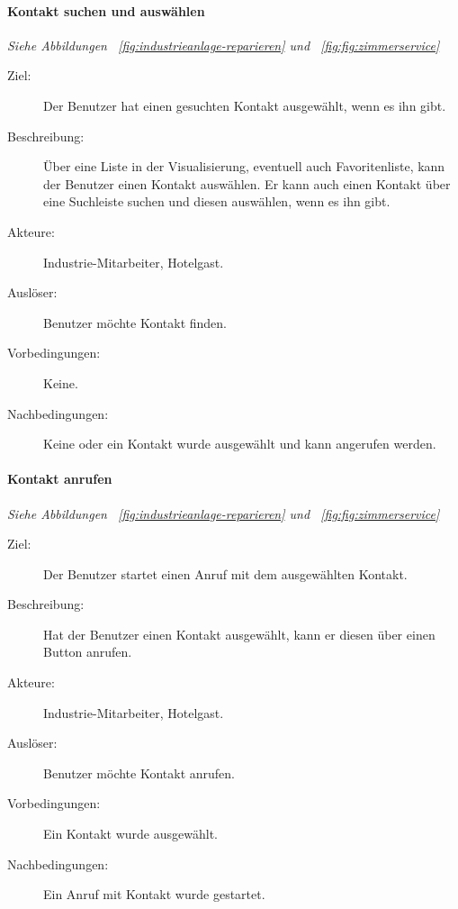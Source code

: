\paragraph{\large{Kontakt suchen und auswählen}}
\textit{Siehe Abbildungen ~\ref{fig:industrieanlage-reparieren} und ~\ref{fig:fig:zimmerservice}}
    \begin{description}
        \item[Ziel:] Der Benutzer hat einen gesuchten Kontakt ausgewählt, wenn es ihn gibt.
        \item[Beschreibung:] Über eine Liste in der Visualisierung, eventuell auch Favoritenliste, kann der Benutzer einen Kontakt auswählen.
            Er kann auch einen Kontakt über eine Suchleiste suchen und diesen auswählen, wenn es ihn gibt.
        \item[Akteure:] Industrie-Mitarbeiter, Hotelgast.
        \item[Auslöser:] Benutzer möchte Kontakt finden.
        \item[Vorbedingungen:] Keine.
        \item[Nachbedingungen:] Keine oder ein Kontakt wurde ausgewählt und kann angerufen werden.
    \end{description}

\paragraph{\large{Kontakt anrufen}}
\textit{Siehe Abbildungen ~\ref{fig:industrieanlage-reparieren} und ~\ref{fig:fig:zimmerservice}}
    \begin{description}
        \item[Ziel:] Der Benutzer startet einen Anruf mit dem ausgewählten Kontakt.
        \item[Beschreibung:] Hat der Benutzer einen Kontakt ausgewählt, kann er diesen über einen Button anrufen.
        \item[Akteure:] Industrie-Mitarbeiter, Hotelgast.
        \item[Auslöser:] Benutzer möchte Kontakt anrufen.
        \item[Vorbedingungen:] Ein Kontakt wurde ausgewählt.
        \item[Nachbedingungen:] Ein Anruf mit Kontakt wurde gestartet.
    \end{description}

